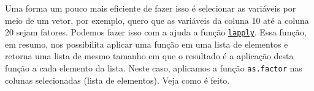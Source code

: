 \documentclass[
  letterpaper,
  DIV=11,
  numbers=noendperiod]{scrreprt}
\newenvironment{Shaded}{\begin{snugshade}}{\end{snugshade}}
\newcommand{\FunctionTok}[1]{\textcolor[rgb]{0.28,0.35,0.67}{#1}}
\newcommand{\NormalTok}[1]{\textcolor[rgb]{0.00,0.23,0.31}{#1}}
\newcommand{\OtherTok}[1]{\textcolor[rgb]{0.00,0.23,0.31}{#1}}
\newcommand{\SpecialCharTok}[1]{\textcolor[rgb]{0.37,0.37,0.37}{#1}}
\begin{document}
\begin{Shaded}
\end{Shaded}

Uma forma um pouco mais eficiente de fazer isso é selecionar as
variáveis por meio de um vetor, por exemplo, quero que as variáveis da
coluna 10 até a coluna 20 sejam fatores. Podemos fazer isso com a ajuda
a função
\href{https://www.geeksforgeeks.org/apply-lapply-sapply-and-tapply-in-r/}{\texttt{lapply}}.
Essa função, em resumo, nos possibilita aplicar uma função em uma lista
de elementos e retorna uma lista de mesmo tamanho em que o resultado é a
aplicação desta função a cada elemento da lista. Neste caso, aplicamos a
função \texttt{as.factor} nas colunas selecionadas (lista de elementos).
Veja como é feito.\\
\end{document}
